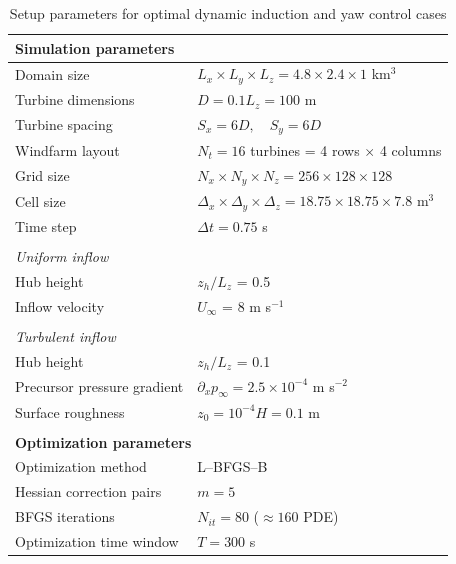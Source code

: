 \documentclass[energies,article,submit,moreauthors,latex,10pt,a4paper]{mdpi}
\begin{document}
\begin{table}
	\caption{Setup parameters for optimal dynamic induction and yaw control cases \label{tab:case_definition}}
	\centering
	\begin{tabular}{llccc}
		\toprule
		\multicolumn{5}{l}{\textbf{Simulation parameters}}\\
		\midrule
		Domain size  			& \multicolumn{4}{l}{$L_x \times L_y \times L_z = 4.8 \times 2.4 \times 1$ km$^3$}  \\ 
		Turbine dimensions  		& \multicolumn{4}{l}{$D = 0.1L_z = 100$ m}\\ 
		Turbine spacing  		& \multicolumn{4}{l}{$S_x = 6D, \quad S_y = 6D$}\\
		Windfarm layout 		& \multicolumn{4}{l}{$N_t = 16 $ turbines = 4 rows $\times$ 4 columns} \\ 
		Grid size 			& \multicolumn{4}{l}{$N_x \times N_y \times N_z = 256 \times 128 \times 128$}\\
		Cell size 			& \multicolumn{4}{l}{$\Delta_x \times \Delta_y \times \Delta_z = 18.75 \times 18.75 \times 7.8$ m$^3$}\\
		Time step 			& \multicolumn{4}{l}{$\Delta t = 0.75$ s}\\		
		& & & & \\	
		\multicolumn{5}{l}{\textit{Uniform inflow}}\\
		Hub height & \multicolumn{4}{l}{$z_h/L_z$ = 0.5}\\
		Inflow velocity & \multicolumn{4}{l}{$U_\infty$ = 8 m s$^{-1}$}\\
		& & & & \\			
		\multicolumn{5}{l}{\textit{Turbulent inflow}}\\
		Hub height & \multicolumn{4}{l}{$z_h/L_z$ = 0.1}\\		
		Precursor pressure gradient  	& \multicolumn{4}{l}{$ \partial_x p_\infty = 2.5 \times 10^{-4}$ m s$^{-2}$}  \\ 
		Surface roughness  &  \multicolumn{4}{l}{$z_0 = 10^{-4}H = 0.1$ m}\\ 		
		& & & & \\	
		\toprule
		\multicolumn{5}{l}{\textbf{Optimization parameters}}\\
		\midrule
		Optimization method		& \multicolumn{4}{l}{L--BFGS--B} \\
		Hessian correction pairs	& \multicolumn{4}{l}{$m = 5$} \\
		BFGS iterations 		& \multicolumn{4}{l}{$N_{it} = 80$ ($\approx 160$ PDE)} \\
		Optimization time window	& \multicolumn{4}{l}{$T = 300$ s}\\

\end{tabular}
\end{table}
\end{document}
